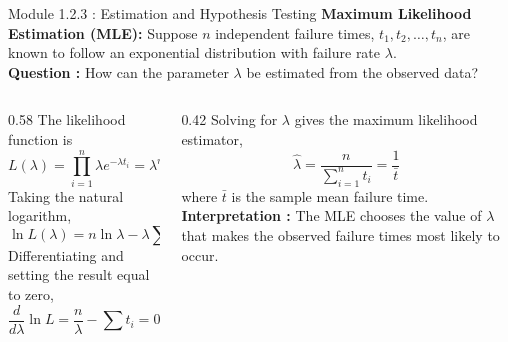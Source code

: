 \documentclass{beamer}
\begin{document}
\begin{frame}{Module 1.2.3 : Estimation and Hypothesis Testing}
\scriptsize
\textbf{Maximum Likelihood Estimation (MLE):}
Suppose $n$ independent failure times,
$t_1,t_2,\ldots,t_n$, are known to follow an exponential distribution
with failure rate $\lambda$. \\ \vspace{0.25cm}
\textbf{Question :}
How can the parameter $\lambda$ be estimated from the observed data?
\vspace{0.25cm}
\begin{columns}[T]
\begin{column}{0.58\textwidth}
\scriptsize
The likelihood function is
\begin{equation}
L(\lambda)=\prod_{i=1}^{n}\lambda e^{-\lambda t_i}=\lambda^n e^{-\lambda\sum t_i}.
\end{equation}
Taking the natural logarithm,
\begin{equation}
\ln L(\lambda)=n\ln\lambda-\lambda\sum t_i
\end{equation}
Differentiating and setting the result equal to zero,
\begin{equation}
\frac{d}{d\lambda}\ln L=\frac{n}{\lambda}-\sum t_i=0
\end{equation}
\end{column}
\begin{column}{0.42\textwidth}
\scriptsize
Solving for $\lambda$ gives the maximum likelihood estimator,
\begin{equation}
\boxed{\hat{\lambda}=\frac{n}{\sum_{i=1}^{n}t_i}=\frac{1}{\bar t}}
\end{equation}
where $\bar t$ is the sample mean failure time. \\ \vspace{0.25cm}
\textbf{Interpretation :} The MLE chooses the value of $\lambda$ that makes the observed failure times most likely to occur.
\end{column}
\end{columns}
\end{frame}
\end{document}
